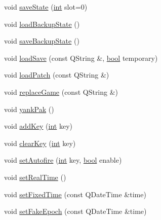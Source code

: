 \begin{DoxyCompactItemize}
\item 
void \mbox{\hyperlink{class_q_g_b_a_1_1_core_controller_a1d7445620b89f8c7a2c4d4d55bc71e60}{save\+State}} (\mbox{\hyperlink{ioapi_8h_a787fa3cf048117ba7123753c1e74fcd6}{int}} slot=0)
\item 
void \mbox{\hyperlink{class_q_g_b_a_1_1_core_controller_ae3c6183c96ff473cdbdc86132de04ac7}{load\+Backup\+State}} ()
\item 
void \mbox{\hyperlink{class_q_g_b_a_1_1_core_controller_abb260a8e1ee3fd1e6eb23586ed864fdc}{save\+Backup\+State}} ()
\item 
void \mbox{\hyperlink{class_q_g_b_a_1_1_core_controller_a798a269094b1066d112bd530cd2b87f1}{load\+Save}} (const Q\+String \&, \mbox{\hyperlink{libretro_8h_a4a26dcae73fb7e1528214a068aca317e}{bool}} temporary)
\item 
void \mbox{\hyperlink{class_q_g_b_a_1_1_core_controller_a2b403c6740acab8b9e752375e35110cb}{load\+Patch}} (const Q\+String \&)
\item 
void \mbox{\hyperlink{class_q_g_b_a_1_1_core_controller_a132edaa3596891696512074c6f6bff70}{replace\+Game}} (const Q\+String \&)
\item 
void \mbox{\hyperlink{class_q_g_b_a_1_1_core_controller_a21c0c9f1828be3312e5c6dbc40fdefc3}{yank\+Pak}} ()
\item 
void \mbox{\hyperlink{class_q_g_b_a_1_1_core_controller_a9dc0efe3d090dc954ce54436006bbd7d}{add\+Key}} (\mbox{\hyperlink{ioapi_8h_a787fa3cf048117ba7123753c1e74fcd6}{int}} key)
\item 
void \mbox{\hyperlink{class_q_g_b_a_1_1_core_controller_a123e318815a07e7fb5c0fa55e0d4daa7}{clear\+Key}} (\mbox{\hyperlink{ioapi_8h_a787fa3cf048117ba7123753c1e74fcd6}{int}} key)
\item 
void \mbox{\hyperlink{class_q_g_b_a_1_1_core_controller_a8577665591ba435a0a61c40e5b3903e2}{set\+Autofire}} (\mbox{\hyperlink{ioapi_8h_a787fa3cf048117ba7123753c1e74fcd6}{int}} key, \mbox{\hyperlink{libretro_8h_a4a26dcae73fb7e1528214a068aca317e}{bool}} enable)
\item 
void \mbox{\hyperlink{class_q_g_b_a_1_1_core_controller_a0d6489c3a46a52b7cc84ec28f36790be}{set\+Real\+Time}} ()
\item 
void \mbox{\hyperlink{class_q_g_b_a_1_1_core_controller_a6c5ba857cabaa2042dafe331edda5801}{set\+Fixed\+Time}} (const Q\+Date\+Time \&time)
\item 
void \mbox{\hyperlink{class_q_g_b_a_1_1_core_controller_a7f09410184e61422372609a6605c9052}{set\+Fake\+Epoch}} (const Q\+Date\+Time \&time)
\item 

\end{DoxyCompactItemize}
